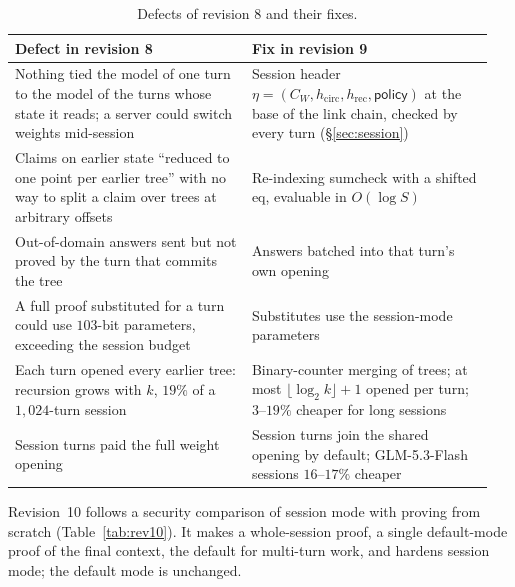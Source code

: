 \documentclass[11pt]{article}
\begin{document}
\begin{table}[h]
\centering\small
\begin{tabular}{@{}p{0.47\linewidth}p{0.48\linewidth}@{}}
\toprule
Defect in revision 8 & Fix in revision 9 \\
\midrule
Nothing tied the model of one turn to the model of the turns whose state it reads; a server could switch weights mid-session & Session header \(\eta = (C_W, h_{\mathrm{circ}}, h_{\mathrm{rec}}, \mathsf{policy})\) at the base of the link chain, checked by every turn (\S\ref{sec:session}) \\
Claims on earlier state ``reduced to one point per earlier tree'' with no way to split a claim over trees at arbitrary offsets & Re-indexing sumcheck with a shifted \(\mathrm{eq}\), evaluable in \(O(\log S)\) \\
Out-of-domain answers sent but not proved by the turn that commits the tree & Answers batched into that turn's own opening \\
A full proof substituted for a turn could use \(103\)-bit parameters, exceeding the session budget & Substitutes use the session-mode parameters \\
Each turn opened every earlier tree: recursion grows with \(k\), \(19\%\) of a \(1{,}024\)-turn session & Binary-counter merging of trees; at most \(\lfloor\log_2 k\rfloor + 1\) opened per turn; \(3\)--\(19\%\) cheaper for long sessions \\
Session turns paid the full weight opening & Session turns join the shared opening by default; GLM-5.3-Flash sessions \(16\)--\(17\%\) cheaper \\
\bottomrule
\end{tabular}
\caption{Defects of revision 8 and their fixes.}
\label{tab:rev9}
\end{table}

Revision~10 follows a security comparison of session mode with proving from scratch (Table~\ref{tab:rev10}). It makes a whole-session proof, a single default-mode proof of the final context, the default for multi-turn work, and hardens session mode; the default mode is unchanged.
\end{document}
